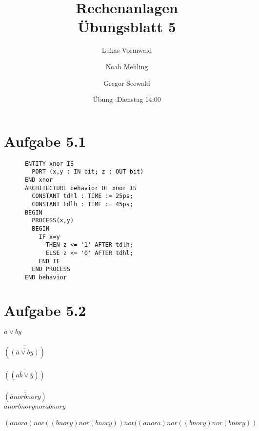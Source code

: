 \documentclass[11pt,a4paper]{article}
\title{Rechenanlagen\\Übungsblatt 5}
\author{Lukas Vormwald \and Noah Mehling \and Gregor Seewald}
\date{Übung :Dienstag 14:00}
\begin{document}
  \section*{Aufgabe 5.1}
    \begin{verbatim}
      ENTITY xnor IS
        PORT (x,y : IN bit; z : OUT bit)
      END xnor
      ARCHITECTURE behavior OF xnor IS
        CONSTANT tdhl : TIME := 25ps;
        CONSTANT tdlh : TIME := 45ps;
      BEGIN
        PROCESS(x,y)
        BEGIN
          IF x=y
            THEN z <= '1' AFTER tdlh;
            ELSE z <= '0' AFTER tdhl;
          END IF
        END PROCESS
      END behavior
    \end{verbatim}
  \section*{Aufgabe 5.2}
    $\bar a \vee by$\\\\
    $\overline{(\overline{(\bar a \vee by)})}$\\\\
    $\overline{((a \bar b \vee \bar y))}$\\\\
    $\overline{(\bar a nor \bar b nor y)}$\\
    $\bar a nor \bar b nor y nor \bar a \bar b nor y$\\\\
    $(a nor a) nor ((b nor y) nor (b nor y)) nor ((a nor a) nor ((b nor y) nor (b nor y))$
\end{document}
